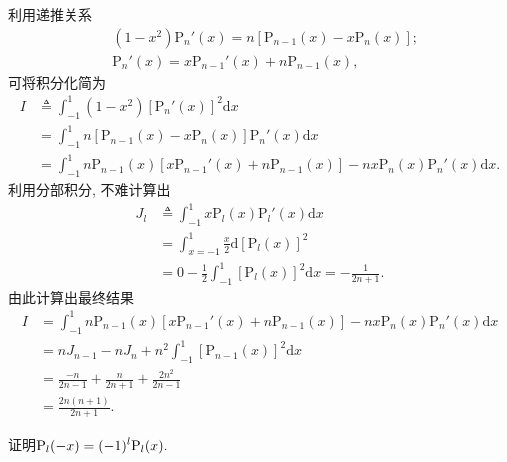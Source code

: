 \begin{yyProof}
	利用递推关系\begin{equation*}
		\begin{split}
			&(1-x^2)\mathrm{P}_n'(x) = n[\mathrm{P}_{n-1}(x)-x\mathrm{P}_n(x)]; \\
			&\mathrm{P}_n'(x) = x\mathrm{P}_{n-1}'(x)+n\mathrm{P}_{n-1}(x),
		\end{split}
	\end{equation*}
	可将积分化简为\begin{equation*}
		\begin{split}
		I &\triangleq \int_{-1}^{1}(1-x^2)[\mathrm{P}_n'(x)]^2\mathrm{d}x\\
		 &= \int_{-1}^{1}n[\mathrm{P}_{n-1}(x)-x\mathrm{P}_n(x)]\mathrm{P}_n'(x)\mathrm{d}x\\
		&= \int_{-1}^{1}n\mathrm{P}_{n-1}(x)[x\mathrm{P}_{n-1}'(x)+n\mathrm{P}_{n-1}(x)]-nx\mathrm{P}_n(x)\mathrm{P}_n'(x)\mathrm{d}x.
		\end{split}
	\end{equation*}
	利用分部积分, 不难计算出\begin{equation*}
		\begin{split}
			J_l&\triangleq \int_{-1}^{1}x\mathrm{P}_l(x)\mathrm{P}_l'(x)\mathrm{d}x\\
			 &= \int_{x = -1}^{1}\frac{x}{2}\mathrm{d}[\mathrm{P}_l(x)]^2 \\
			&= 0 - \frac{1}{2}\int_{-1}^1 [\mathrm{P}_l(x)]^2\mathrm{d}x = -\frac{1}{2n+1}.
		\end{split}
	\end{equation*}
	由此计算出最终结果
	\begin{equation*}
	\begin{split}
	I &= \int_{-1}^{1}n\mathrm{P}_{n-1}(x)[x\mathrm{P}_{n-1}'(x)+n\mathrm{P}_{n-1}(x)]-nx\mathrm{P}_n(x)\mathrm{P}_n'(x)\mathrm{d}x \\
	&= nJ_{n-1}-nJ_n +n^2\int_{-1}^1[\mathrm{P}_{n-1}(x)]^2\mathrm{d}x \\
	&= \frac{-n}{2n-1}+\frac{n}{2n+1}+\frac{2n^2}{2n-1} \\
	&= \frac{2n(n+1)}{2n+1}.
	\end{split}
	\end{equation*}
\end{yyProof}

\begin{yyEx}
	证明$\begin{lgathered}
		\mathrm{P}_l(-x) = (-1)^l\mathrm{P}_l(x).
	\end{lgathered}$
\end{yyEx}

